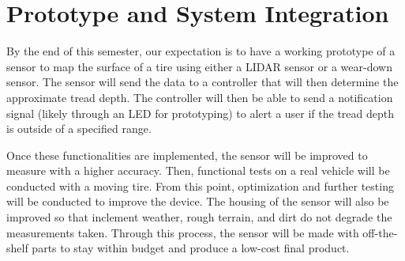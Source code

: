 \documentclass[11pt]{IEEEtran}
\begin{document}
	\section{Prototype and System Integration}
		By the end of this semester, our expectation is to have a working prototype of a sensor to map the surface of a tire using either a LIDAR sensor or a wear-down sensor. The sensor will send the data to a controller that will then determine the approximate tread depth. The controller will then be able to send a notification signal (likely through an LED for prototyping) to alert a user if the tread depth is outside of a specified range.

		Once these functionalities are implemented, the sensor will be improved to measure with a higher accuracy. Then, functional tests on a real vehicle will be conducted with a moving tire. From this point, optimization and further testing will be conducted to improve the device. The housing of the sensor will also be improved so that inclement weather, rough terrain, and dirt do not degrade the measurements taken. Through this process, the sensor will be made with off-the-shelf parts to stay within budget and produce a low-cost final product.
\end{document}
